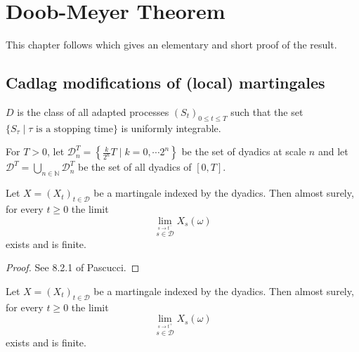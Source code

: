 \chapter{Doob-Meyer Theorem}
\label{chap:doob_meyer}


This chapter follows \cite{Beiglböck_Schachermayer_Veliyev_2012}
which gives an elementary and short proof of the result.



\section{Cadlag modifications of (local) martingales}



\begin{definition}\label{def:Doob_Meyer_class}
$D$ is the class of all adapted processes $(S_t)_{0\leq t\leq T}$ such that the set $\{S_\tau \mid \tau \text{ is a stopping time}\}$ is uniformly integrable.
\end{definition}


\begin{definition}[Dyadics]\label{def:dyadics}
For $T>0$, let $\mathcal{D}_n^T = \left\lbrace \frac{k}{2^n}T \mid k=0,\cdots 2^n\right\rbrace$ be the set of dyadics at scale $n$ and let $\mathcal{D}^T=\bigcup_{n\in\mathbb{N}}\mathcal{D}_n^T$ be the set of all dyadics of $[0,T]$.
\end{definition}


\begin{lemma}\label{lem:martingale_exists_dyadic_limit_left}
  Let $X=(X_t)_{t\in\mathcal{D}}$ be a martingale indexed by the dyadics. Then almost surely, for every $t\geq 0$ the limit
  $$
  \lim_{\stackrel{s\rightarrow t^-}{s\in\mathcal{D}}}X_s(\omega)
  $$
  exists and is finite.
\end{lemma}

\begin{proof}
  See 8.2.1 of Pascucci.
\end{proof}


\begin{lemma}\label{lem:martingale_exists_dyadic_limit_right}
  Let $X=(X_t)_{t\in\mathcal{D}}$ be a martingale indexed by the dyadics. Then almost surely, for every $t\geq 0$ the limit
  $$
  \lim_{\stackrel{s\rightarrow t^+}{s\in\mathcal{D}}}X_s(\omega)
  $$
  exists and is finite.
\end{lemma}

